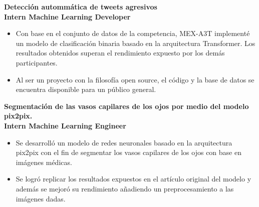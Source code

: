 \documentclass[a3paper]{adcv_color}
\newcommand{\proyect}[2]{
\textbf{#2}\\
{\color{linktext}	\textbf {#1}}
\vspace{-1cm}\\
}
\begin{document}
\proyect{Intern Machine Learning Developer}{Detección autommática de tweets agresivos}
\begin{itemize}
	\setlength\itemsep{0em}
	\item Con base en el conjunto de datos de la competencia, MEX-A3T implementé un modelo de clasificación binaria basado en la arquitectura Transformer. Los resultados obtenidos superan el rendimiento expuesto por los demás participantes.
	\item  Al ser un proyecto con la filosofía open source, el código y la base de datos se encuentra disponible para un público general.
\end{itemize}
\proyect{Intern Machine Learning Engineer}{Segmentación de las vasos capilares de los ojos por medio del modelo pix2pix.}
\begin{itemize}
	\setlength\itemsep{0em}
	\item Se desarrolló un modelo de redes neuronales basado en la arquitectura pix2pix con el fin de segmentar los vasos capilares de los ojos con base en imágenes médicas.
	\item Se logró replicar los resultados expuestos en el artículo original del modelo y además se mejoró su rendimiento añadiendo un preprocesamiento a las imágenes dadas.
\end{itemize}



\end{document}
